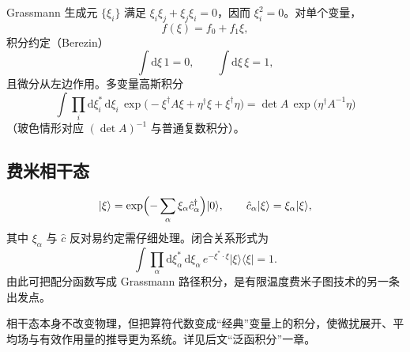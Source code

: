 Grassmann 生成元 $\{\xi_i\}$ 满足 $\xi_i\xi_j+\xi_j\xi_i=0$，因而 $\xi_i^2=0$。对单个变量，
\begin{equation}
  f(\xi)=f_0+f_1\xi,
\end{equation}
积分约定（Berezin）
\begin{equation}
  \int\mathrm{d}\xi\,1=0,
  \qquad
  \int\mathrm{d}\xi\,\xi=1,
\end{equation}
且微分从左边作用。多变量高斯积分
\begin{equation}
  \int\prod_i\mathrm{d}\xi_i^*\,\mathrm{d}\xi_i\,
  \exp\bigl(-\xi^\dagger A\xi+\eta^\dagger\xi+\xi^\dagger\eta\bigr)
  =\det A\,
  \exp\bigl(\eta^\dagger A^{-1}\eta\bigr)
\end{equation}
（玻色情形对应 $(\det A)^{-1}$ 与普通复数积分）。

\subsection{费米相干态}

\begin{equation}
  |\xi\rangle
  =\exp\Bigl(-\sum_\alpha\xi_\alpha\hat c_\alpha^\dagger\Bigr)|0\rangle,
  \qquad
  \hat c_\alpha|\xi\rangle=\xi_\alpha|\xi\rangle,
\end{equation}
其中 $\xi_\alpha$ 与 $\hat c$ 反对易约定需仔细处理。闭合关系形式为
\begin{equation}
  \int\prod_\alpha\mathrm{d}\xi_\alpha^*\,\mathrm{d}\xi_\alpha\,
  e^{-\xi^*\cdot\xi}|\xi\rangle\langle\xi|=1.
\end{equation}
由此可把配分函数写成 Grassmann 路径积分，是有限温度费米子图技术的另一条出发点。

\begin{note}
相干态本身不改变物理，但把算符代数变成“经典”变量上的积分，使微扰展开、平均场与有效作用量的推导更为系统。详见后文“泛函积分”一章。
\end{note}
